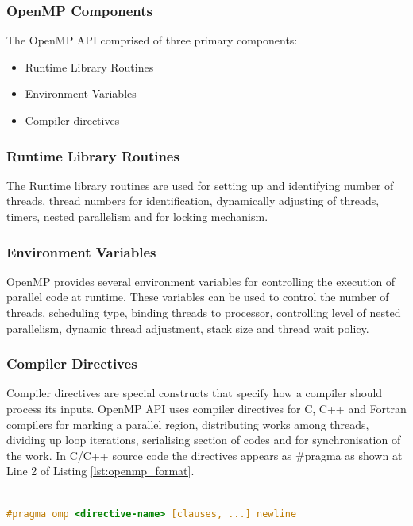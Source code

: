 \subsubsection{OpenMP Components}
The OpenMP API comprised of three primary components:
\begin{itemize}
	\item Runtime Library Routines
	\item Environment Variables
	\item Compiler directives
\end{itemize}

\subsubsection{Runtime Library Routines}
The Runtime library routines are used for setting up  and identifying number of threads, thread numbers for identification, dynamically adjusting of threads, timers, nested parallelism and for locking mechanism. \citep{Barney:16-openmp}

\subsubsection{Environment Variables}
OpenMP provides several environment variables for controlling the execution of parallel code at runtime. These variables can be used to control the number of threads, scheduling type, binding threads to processor, controlling level of nested parallelism, dynamic thread adjustment, stack size and thread wait policy. \citep{Barney:16-openmp}


\subsubsection{Compiler Directives}
Compiler directives are special constructs that specify how a compiler should process its inputs. OpenMP API uses compiler directives for C, C++ and Fortran compilers for marking a parallel region, distributing works among threads, dividing up loop iterations, serialising section of codes and for synchronisation of the work. In C/C++ source code the directives appears as \#pragma as shown at Line 2 of Listing  \ref{lst:openmp_format}. \citep{Barney:16-openmp}

\begin{lstlisting}[language=C, caption={OpenMP directive format in C/C++}, label={lst:openmp_format}]

#pragma omp <directive-name> [clauses, ...] newline

\end{lstlisting}

